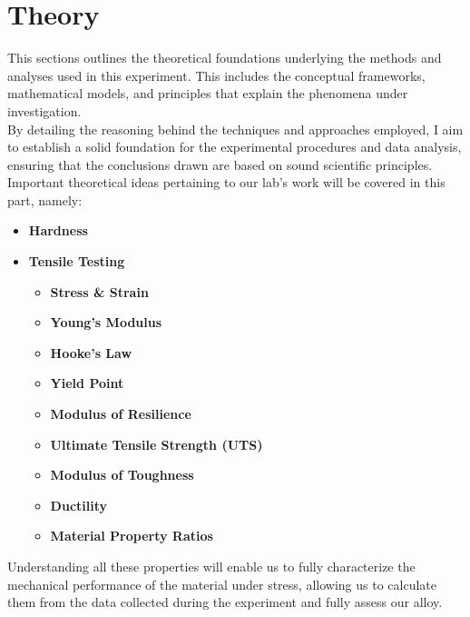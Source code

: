 \documentclass{article}
\begin{document}
    \section{Theory}
    This sections outlines the theoretical foundations underlying the methods and analyses used in this experiment. This includes the conceptual frameworks, mathematical models, and principles that explain the phenomena under investigation.\\[8pt]
    By detailing the reasoning behind the techniques and approaches employed, I aim to establish a solid foundation for the experimental procedures and data analysis, ensuring that the conclusions drawn are based on sound scientific principles.\\[8pt]
    Important theoretical ideas pertaining to our lab's work will be covered in this part, namely:
    \begin{itemize}
        \item \textbf{Hardness}
        \item \textbf{Tensile Testing}
        \begin{itemize}
            \item \textbf{Stress \& Strain}
            \item \textbf{Young's Modulus}
            \item \textbf{Hooke's Law}
            \item \textbf{Yield Point}
            \item \textbf{Modulus of Resilience}
            \item \textbf{Ultimate Tensile Strength (UTS)}
            \item \textbf{Modulus of Toughness}
            \item \textbf{Ductility}
            \item \textbf{Material Property Ratios}
        \end{itemize}
    \end{itemize}
    Understanding all these properties will enable us to fully characterize the mechanical performance of the material under stress, allowing us to calculate them from the data collected during the experiment and fully assess our alloy.
    \newpage
\end{document}
